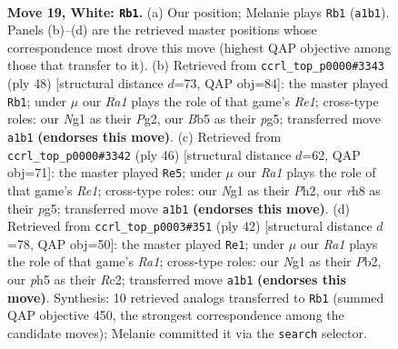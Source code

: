 \documentclass[11pt]{article}
\begin{document}
\clearpage

\begin{figure}[p]\centering
\begin{subfigure}{0.46\textwidth}\centering
\resizebox{\linewidth}{!}{%
\newchessgame
\chessboard[
  setfen={rn5r/6k1/5p2/pB1p3p/3Pp2q/8/PPQ2PP1/R3K1N1 w Q - 0 19},
  showmover=false,
  pgfstyle=straightmove, color=movearrow, markmove={a1-b1}
]}
\caption{}
\end{subfigure}\hfill
\begin{subfigure}{0.46\textwidth}\centering
\resizebox{\linewidth}{!}{%
\newchessgame
\chessboard[
  setfen={6k1/1p1r4/2q3np/p2p2pN/P2P4/1QP5/6PP/4R1K1 w - - 2 25},
  showmover=false,
  pgfstyle=straightmove, color=movearrow, markmove={e1-b1}
]}
\caption{}
\end{subfigure}
\\[4pt]
\begin{subfigure}{0.46\textwidth}\centering
\resizebox{\linewidth}{!}{%
\newchessgame
\chessboard[
  setfen={5nk1/pp3r2/2q4p/3p2pN/3P4/1QP5/P5PP/4R1K1 w - - 2 24},
  showmover=false,
  pgfstyle=straightmove, color=movearrow, markmove={e1-e5}
]}
\caption{}
\end{subfigure}\hfill
\begin{subfigure}{0.46\textwidth}\centering
\resizebox{\linewidth}{!}{%
\newchessgame
\chessboard[
  setfen={r5k1/p2qrppp/1p6/4P3/3p1Q2/P2P3P/1PR3P1/R5K1 w - - 0 22},
  showmover=false,
  pgfstyle=straightmove, color=movearrow, markmove={a1-e1}
]}
\caption{}
\end{subfigure}
\caption{\textbf{Move 19, White: \texttt{Rb1}.} (a) Our position; Melanie plays \texttt{Rb1} (\texttt{a1b1}). Panels (b)--(d) are the retrieved master positions whose correspondence most drove this move (highest QAP objective among those that transfer to it). (b) Retrieved from \texttt{ccrl\_top\_p0000\#3343} (ply 48) [structural distance $d$=73, QAP obj=84]: the master played \texttt{Rb1}; under $\mu$ our \emph{Ra1} plays the role of that game's \emph{Re1}; cross-type roles: our \emph{N}g1 as their \emph{P}g2, our \emph{B}b5 as their \emph{p}g5; transferred move \texttt{a1b1} \textbf{(endorses this move)}. (c) Retrieved from \texttt{ccrl\_top\_p0000\#3342} (ply 46) [structural distance $d$=62, QAP obj=71]: the master played \texttt{Re5}; under $\mu$ our \emph{Ra1} plays the role of that game's \emph{Re1}; cross-type roles: our \emph{N}g1 as their \emph{P}h2, our \emph{r}h8 as their \emph{p}g5; transferred move \texttt{a1b1} \textbf{(endorses this move)}. (d) Retrieved from \texttt{ccrl\_top\_p0003\#351} (ply 42) [structural distance $d$=78, QAP obj=50]: the master played \texttt{Re1}; under $\mu$ our \emph{Ra1} plays the role of that game's \emph{Ra1}; cross-type roles: our \emph{N}g1 as their \emph{P}b2, our \emph{p}h5 as their \emph{R}c2; transferred move \texttt{a1b1} \textbf{(endorses this move)}. Synthesis: 10 retrieved analogs transferred to \texttt{Rb1} (summed QAP objective 450, the strongest correspondence among the candidate moves); Melanie committed it via the \texttt{search} selector.}
\label{fig:thought-m36}
\end{figure}
\end{document}
